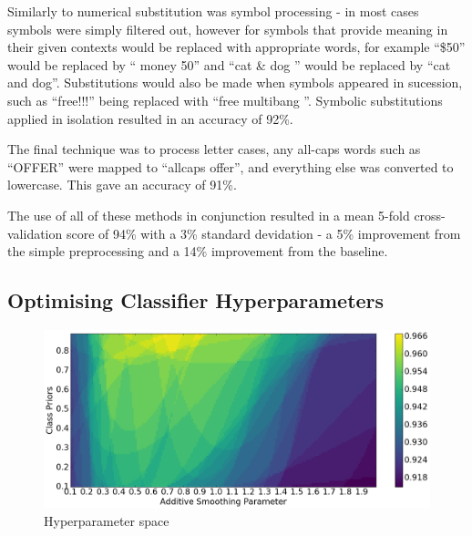 \documentclass[12pt, a4paper]{article}
\begin{document}
  Similarly to numerical substitution was symbol processing - in most cases symbols were simply filtered out, however for symbols that provide meaning in their given contexts would be replaced with appropriate words, for example ``\$50'' would be replaced by `` money 50'' and ``cat \& dog '' would be replaced by ``cat and dog''. Substitutions would also be made when symbols appeared in sucession, such as ``free!!!'' being replaced with ``free multibang ''. Symbolic substitutions applied in isolation resulted in an accuracy of 92\%.


  The final technique was to process letter cases, any all-caps words such as ``OFFER'' were mapped to ``allcaps offer'', and everything else was converted to lowercase. This gave an accuracy of 91\%.

  The use of all of these methods in conjunction resulted in a mean 5-fold cross-validation score of 94\% with a 3\% standard devidation - a 5\% improvement from the simple preprocessing and a 14\% improvement from the baseline.




  \pagebreak

  \subsection{Optimising Classifier Hyperparameters} \label{hyperopt}

  \begin{figure}
    \vspace{-0.6cm}
    \caption{Hyperparameter space}
    \vspace{-0.1cm}
    \label{hyperspace}
    \centering
    \includegraphics[width=1\linewidth]{report_images/MultinomialNB_param_space}
    \vspace{-1cm}
  \end{figure}
\end{document}
